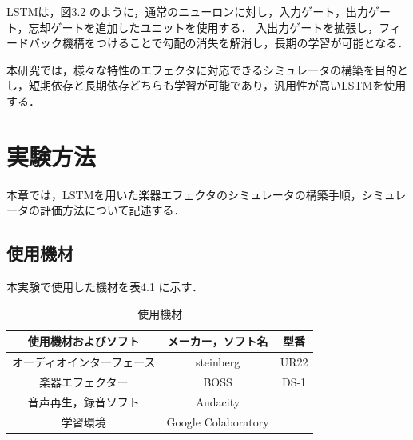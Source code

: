 \documentclass{jreport}		%
\begin{document}
LSTMは，図3.2 のように，通常のニューロンに対し，入力ゲート，出力ゲート，忘却ゲートを追加したユニットを使用する．
入出力ゲートを拡張し，フィードバック機構をつけることで勾配の消失を解消し，長期の学習が可能となる．\cite{RNN}

本研究では，様々な特性のエフェクタに対応できるシミュレータの構築を目的とし，短期依存と長期依存どちらも学習が可能であり，汎用性が高いLSTMを使用する．

\chapter{実験方法}
本章では，LSTMを用いた楽器エフェクタのシミュレータの構築手順，シミュレータの評価方法について記述する．

\section{使用機材}
本実験で使用した機材を表4.1 に示す．
\begin{table}[h]
  \begin{center}
  \caption{使用機材}
  \begin{tabular}{c|cc} \hline
使用機材およびソフト&メーカー，ソフト名&型番 \\ \hline
    オーディオインターフェース&steinberg&UR22 \\
    楽器エフェクター&BOSS&DS-1\\
    音声再生，録音ソフト&Audacity& \\
    学習環境&Google Colaboratory& \\ \hline
  \end{tabular}
 \end{center}
\end{table}
\end{document}
